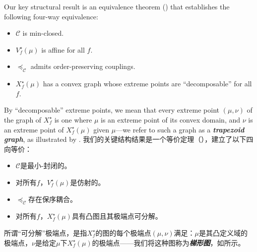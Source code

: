 \documentclass[12pt,letterpaper]{article}
\newenvironment{original}{\color{black}}{}
\newenvironment{translation}{\color{blue}}{}
\theoremstyle{plain}
\theoremstyle{definition}
\theoremstyle{remark}
\newcommand{\C}{\mathcal{C}}
\theoremstyle{definition}
\begin{document}
\begin{original}
Our key structural result is an equivalence theorem () that establishes the following four-way equivalence:
\begin{itemize}
    \item[(a)] $\C$ is min-closed.
    \item[(b)] $V^\star_f(\mu)$ is affine for all $f$.
    \item[(c)] $\preceq_\C$ admits order-preserving couplings.
    \item[(d)] $X^\star_f(\mu)$ has a convex graph whose extreme points are ``decomposable'' for all $f$.
\end{itemize}
By ``decomposable'' extreme points, we mean that every extreme point $(\mu, \nu)$ of the graph of $X^\star_f$ is one where $\mu$ is an extreme point of its convex domain, and $\nu$ is an extreme point of $X^\star_f(\mu)$ given $\mu$---we refer to such a graph as a \textit{\textbf{trapezoid graph}}, as illustrated by .
\end{original}
\begin{translation}
我们的关键结构结果是一个等价定理（），建立了以下四向等价：
\begin{itemize}
    \item[(a)] $\C$是最小-封闭的。
    \item[(b)] 对所有$f$，$V^\star_f(\mu)$是仿射的。
    \item[(c)] $\preceq_\C$存在保序耦合。
    \item[(d)] 对所有$f$，$X^\star_f(\mu)$具有凸图且其极端点可分解。
\end{itemize}
所谓``可分解''极端点，是指$X^\star_f$的图的每个极端点$(\mu, \nu)$满足：$\mu$是其凸定义域的极端点，$\nu$是给定$\mu$下$X^\star_f(\mu)$的极端点——我们将这种图称为\textit{\textbf{梯形图}}，如所示。
\end{translation}
\end{document}
